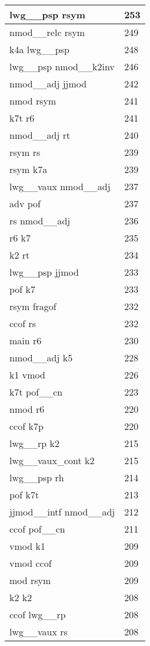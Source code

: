 \documentclass[a4 paper]{article}
\begin{document}
\begin{longtable}{p{}p{}}
lwg\_\_psp rsym  & 253 \\ \midrule
nmod\_\_relc rsym  & 249 \\ \midrule
k4a lwg\_\_psp  & 248 \\ \midrule
lwg\_\_psp nmod\_\_k2inv  & 246 \\ \midrule
nmod\_\_adj jjmod  & 242 \\ \midrule
nmod rsym  & 241 \\ \midrule
k7t r6  & 241 \\ \midrule
nmod\_\_adj rt  & 240 \\ \midrule
rsym rs  & 239 \\ \midrule
rsym k7a  & 239 \\ \midrule
lwg\_\_vaux nmod\_\_adj  & 237 \\ \midrule
adv pof  & 237 \\ \midrule
rs nmod\_\_adj  & 236 \\ \midrule
r6 k7  & 235 \\ \midrule
k2 rt  & 234 \\ \midrule
lwg\_\_psp jjmod  & 233 \\ \midrule
pof k7  & 233 \\ \midrule
rsym fragof  & 232 \\ \midrule
ccof rs  & 232 \\ \midrule
main r6  & 230 \\ \midrule
nmod\_\_adj k5  & 228 \\ \midrule
k1 vmod  & 226 \\ \midrule
k7t pof\_\_cn  & 223 \\ \midrule
nmod r6  & 220 \\ \midrule
ccof k7p  & 220 \\ \midrule
lwg\_\_rp k2  & 215 \\ \midrule
lwg\_\_vaux\_cont k2  & 215 \\ \midrule
lwg\_\_psp rh  & 214 \\ \midrule
pof k7t  & 213 \\ \midrule
jjmod\_\_intf nmod\_\_adj  & 212 \\ \midrule
ccof pof\_\_cn  & 211 \\ \midrule
vmod k1  & 209 \\ \midrule
vmod ccof  & 209 \\ \midrule
mod rsym  & 209 \\ \midrule
k2 k2  & 208 \\ \midrule
ccof lwg\_\_rp  & 208 \\ \midrule
lwg\_\_vaux rs  & 208 \\ \midrule

\end{longtable}
\end{document}
